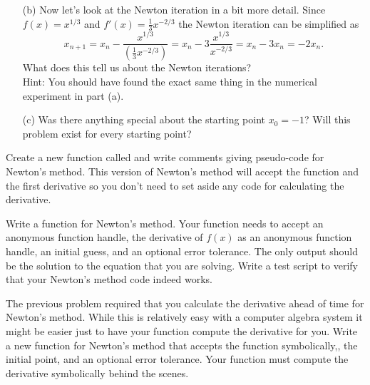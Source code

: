 \begin{problem}
\begin{enumerate}
\item[(b)] Now let's look at the Newton iteration in a bit more detail.  Since $f(x) =
    x^{1/3}$ and $f'(x) = \frac{1}{3} x^{-2/3}$ the Newton iteration can be simplified as 
    \[ x_{n+1} = x_n - \frac{x^{1/3}}{ \left( \frac{1}{3} x^{-2/3} \right)} = x_n - 3 \frac{x^{1/3}}{x^{-2/3}} =
    x_n - 3x_n = -2x_n. \]
    What does this tell us about the Newton iterations?  \\ Hint: You should have found
    the exact same thing in the numerical experiment in part (a).
\item[(c)] Was there anything special about the starting point $x_0=-1$?  Will this
    problem exist for every starting point?
    \end{enumerate}
\end{problem}

\begin{problem}
    Create a new \ProgLang function called  and write comments giving
    pseudo-code for Newton's method.  This version of Newton's method will accept the
    function and the first derivative so you don't need to set aside any code for
    calculating the derivative.
\end{problem}

\begin{problem}
    Write a \ProgLang function for Newton's method.  Your function needs to accept an
    anonymous function handle, the derivative of $f(x)$ as an anonymous function handle,
    an initial guess, and an optional error tolerance. The only output should be the
    solution to the equation that you are solving.  Write a test script to verify that
    your Newton's method code indeed works.
    \\
    \ifnum{}
    \else
    \fi
\end{problem}

\begin{problem}
    The previous problem required that you calculate the derivative ahead of time for
    Newton's method.  While this is relatively easy with a computer algebra system it
    might be easier just to have your function compute the derivative for you.  Write a
    new \ProgLang function for Newton's method that accepts the function symbolically,, the initial point, and an optional error tolerance.  Your function
    must compute the derivative symbolically behind the scenes. \\
    \ifnum{}
    \else
    \fi
\end{problem}

